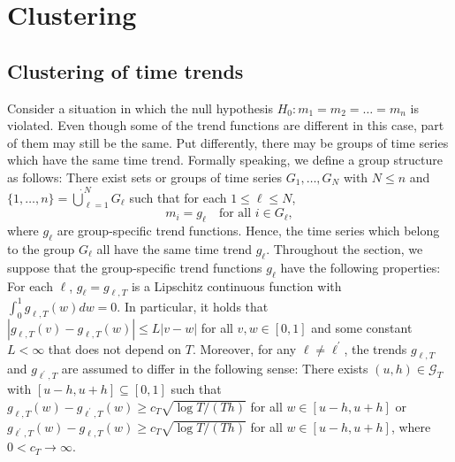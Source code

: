 \section{Clustering}
\subsection{Clustering of time trends}\label{subsec-test-equality-clustering}


Consider a situation in which the null hypothesis $H_0: m_1 = m_2 = \ldots = m_n$ is violated. Even though some of the trend functions are different in this case, part of them may still be the same. Put differently, there may be groups of time series which have the same time trend. Formally speaking, we define a group structure as follows: There exist sets or groups of time series $G_1,\ldots,G_N$ with $N \le n$ and $\{1,\ldots,n\} = \mathbin{\dot{\bigcup}}_{\ell=1}^{N} G_\ell$ such that for each $1 \le \ell \le N$,
\[ m_i = g_\ell \quad \text{for all } i \in G_\ell, \]
where $g_\ell$ are group-specific trend functions. Hence, the time series which belong to the group $G_\ell$ all have the same time trend $g_\ell$. Throughout the section, we suppose that the group-specific trend functions $g_\ell$ have the following properties: For each $\ell$, $g_\ell = g_{\ell,T}$ is a Lipschitz continuous function with $\int_0^1 g_{\ell,T}(w) dw = 0$. In particular, it holds that $|g_{\ell,T}(v) - g_{\ell,T}(w)| \le L |v-w|$ for all $v,w \in [0,1]$ and some constant $L < \infty$ that does not depend on $T$. Moreover, for any $\ell \ne \ell^\prime$, the trends $g_{\ell,T}$ and $g_{\ell^\prime,T}$ are assumed to differ in the following sense: There exists $(u,h) \in \mathcal{G}_T$ with $[u-h,u+h] \subseteq [0,1]$ such that $g_{\ell,T}(w) - g_{\ell^\prime,T}(w) \ge c_T \sqrt{\log T/(Th)}$ for all $w \in [u-h,u+h]$ or $g_{\ell^\prime,T}(w) - g_{\ell,T}(w) \ge c_T \sqrt{\log T/(Th)}$ for all $w \in [u-h,u+h]$, where $0 < c_T \rightarrow \infty$.


